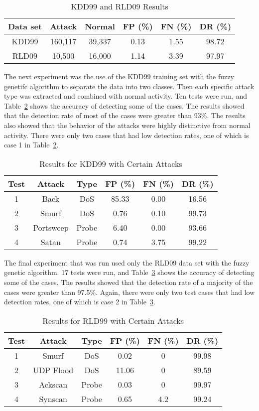 \documentclass{sig-alternate}
\begin{document}
\begin{table}
\caption{KDD99 and RLD09 Results}
\begin{tabular}{|cccccc|} \hline
Data set & Attack & Normal & FP (\%) & FN (\%) & DR (\%)\\ \hline
KDD99 & 160,117 & 39,337 & 0.13 & 1.55 & 98.72\\
RLD09 & 10,500 & 16,000 & 1.14 & 3.39 & 97.97\\
\hline\end{tabular}
\label{tab:bothSetsResults}
\end{table}

The next experiment was the use of the KDD99 training set with the fuzzy genetifc algorithm to separate the data into two classes. Then each specific attack type was extracted and combined with normal activity. Ten tests were run, and Table~\ref{tab:kddAttacks} shows the accuracy of detecting some of the cases. The results showed that the detection rate of most of the cases were greater than 93\%. The results also showed that the behavior of the attacks were highly distinctive from normal activity. There were only two cases that had low detection rates, one of which is case 1 in Table~\ref{tab:kddAttacks}.

\begin{table}
\caption{Results for KDD99 with Certain Attacks}
\begin{tabular}{|cccccc|} \hline
Test & Attack & Type & FP (\%) & FN (\%) & DR (\%)\\ \hline
1 & Back & DoS & 85.33 & 0.00 & 16.56\\
2 & Smurf & DoS & 0.76 & 0.10 & 99.73\\
3 & Portsweep & Probe & 6.40 & 0.00 & 93.66\\
4 & Satan & Probe & 0.74 & 3.75 & 99.22\\
\hline\end{tabular}
\label{tab:kddAttacks}
\end{table}

The final experiment that was run used only the RLD09 data set with the fuzzy genetic algorithm. 17 tests were run, and Table~\ref{tab:rldAttacks} shows the accuracy of detecting some of the cases. The results showed that the detection rate of a majority of the cases were greater than 97.5\%. Again, there were only two test cases that had low detection rates, one of which is case 2 in Table~\ref{tab:rldAttacks}.

\begin{table}
\caption{Results for RLD99 with Certain Attacks}
\begin{tabular}{|cccccc|} \hline
Test & Attack & Type & FP (\%) & FN (\%) & DR (\%)\\ \hline
1 & Smurf & DoS & 0.02 & 0 & 99.98\\
2 & UDP Flood & DoS & 11.06 & 0 & 89.59\\
3 & Ackscan & Probe & 0.03 & 0 & 99.97\\
4 & Synscan & Probe & 0.65 & 4.2 & 99.24\\
\hline\end{tabular}
\label{tab:rldAttacks}
\end{table}
\end{document}
